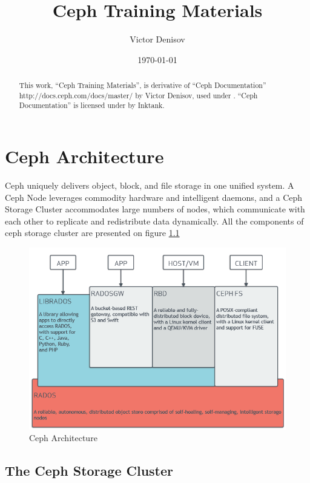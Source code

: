 \documentclass[12pt,a4paper]{report}
\title{Ceph Training Materials}
\author{Victor Denisov}
\date{\today}
\begin{document}
   \maketitle
\begin{abstract}
This work, ``Ceph Training Materials'', is derivative of ``Ceph Documentation'' http://docs.ceph.com/docs/master/ by Victor Denisov, used under \bysa. ``Ceph Documentation'' is licensed under \bysa by Inktank.
\end{abstract}

\makeatletter
\DeclareRobustCommand{\em}{%
  \@nomath\em \if b\expandafter\@car\f@series\@nil
  \normalfont \else \bfseries \fi}
\makeatother

\chapter{Ceph Architecture}
Ceph uniquely delivers object, block, and file storage in one unified system.
A Ceph Node leverages commodity hardware and intelligent daemons, and a Ceph
Storage Cluster accommodates large numbers of nodes, which communicate with
each other to replicate and redistribute data dynamically. All the components
of ceph storage cluster are presented on figure \ref{fig:ceph_architecture}

\begin{figure}[h]
	\includegraphics[scale=0.5]{stack.png}
	\caption{Ceph Architecture}
	\label{fig:ceph_architecture}
\end{figure}

\section{The Ceph Storage Cluster}
\end{document}

